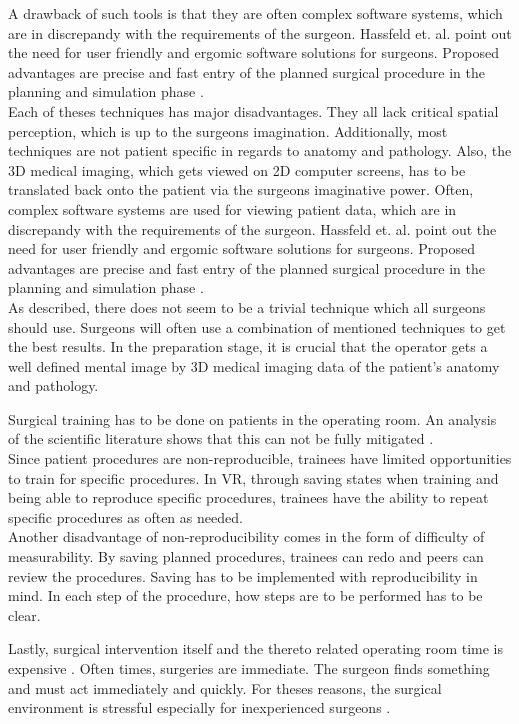 A drawback of such tools is that they are often complex software systems, which are in discrepandy with the requirements of the surgeon.
Hassfeld et. al. point out the need for user friendly and ergomic software solutions for surgeons.
Proposed advantages are precise and fast entry of the planned surgical procedure in the planning and simulation phase \cite{HASSFELD20012}.
\\ Each of theses techniques has major disadvantages.
They all lack critical spatial perception, which is up to the surgeons imagination.
Additionally, most techniques are not patient specific in regards to anatomy and pathology.
Also, the 3D medical imaging, which gets viewed on 2D computer screens, has to be translated back onto the patient via the surgeons imaginative power.
Often, complex software systems are used for viewing patient data, which are in discrepandy with the requirements of the surgeon.
Hassfeld et. al. point out the need for user friendly and ergomic software solutions for surgeons.
Proposed advantages are precise and fast entry of the planned surgical procedure in the planning and simulation phase \cite{HASSFELD20012}.
\\ As described, there does not seem to be a trivial technique which all surgeons should use.
Surgeons will often use a combination of mentioned techniques to get the best results.
In the preparation stage, it is crucial that the operator gets a well defined mental image by 3D medical imaging data of the patient's anatomy and pathology.

Surgical training has to be done on patients in the operating room.
An analysis of the scientific literature shows that this can not be fully mitigated \cite{mcgaghie2011does}.
\\ Since patient procedures are non-reproducible, trainees have limited opportunities to train for specific procedures.
In VR, through saving states when training and being able to reproduce specific procedures, trainees have the ability to repeat specific procedures as often as needed.
\\ Another disadvantage of non-reproducibility comes in the form of difficulty of measurability.
By saving planned procedures, trainees can redo and peers can review the procedures.
Saving has to be implemented with reproducibility in mind.
In each step of the procedure, how steps are to be performed has to be clear.

Lastly, surgical intervention itself and the thereto related operating room time is expensive \cite{Barber.2020}.
Often times, surgeries are immediate.
The surgeon finds something and must act immediately and quickly.
For theses reasons, the surgical environment is stressful especially for inexperienced surgeons \cite{schuetz2008three}.